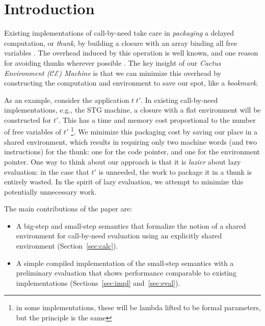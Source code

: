 \section{Introduction}

Existing implementations of call-by-need take care in \emph{packaging} a delayed
computation, or \emph{thunk}, by building a closure with an array binding all
free variables \cite{jonesstg,boquist1997grin}. The overhead induced by
this operation is well known, and one reason for avoiding thunks wherever
possible \cite{johnsson1984efficient}. The key insight of our \emph{Cactus
Environment ($\mathcal{CE}$) Machine} is that we can minimize this overhead by
constructing the computation and environment to save our spot, like a
\emph{bookmark}.

As an example, consider the application $t \; t'$. In existing call-by-need
implementations, e.g., the STG machine, a closure with a flat environment will be
constructed for $t'$.  This has a time and memory cost proportional to the
number of free variables of $t'$ \footnote{in some implementations, these will
be lambda lifted to be formal parameters, but the principle is the same}.  We
minimize this packaging cost by saving our place in a shared environment, which
results in requiring only two machine words (and two instructions) for the
thunk: one for the code pointer, and one for the environment pointer. One way to
think about our approach is that it is \emph{lazier} about lazy evaluation: in
the case that $t'$ is unneeded, the work to package it in a thunk is entirely
wasted. In the spirit of lazy evaluation, we attempt to minimize this
potentially unnecessary work.  

The main contributions of the paper are:
\begin{itemize}
\item A big-step and small-step semantics that formalize the notion of a shared
environment for call-by-need evaluation using an explicitly shared environment
(Section~\ref{sec:calc}).
\item A simple compiled implementation of the small-step semantics with a 
preliminary evaluation that shows performance comparable to existing
implementations (Sections~\ref{sec:impl} and~\ref{sec:eval}).
\end{itemize}

